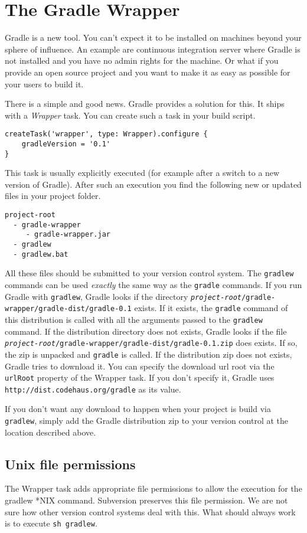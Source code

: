 \chapter{The Gradle Wrapper} %
\label{cha:the_gradle_wrapper}
Gradle is a new tool. You can't expect it to be installed on machines beyond your sphere of influence. An example are continuous integration server where Gradle is not installed and you have no admin rights for the machine. Or what if you provide an open source project and you want to make it as easy as possible for your users to build it.

There is a simple and good news. Gradle provides a solution for this. It ships with a \emph{Wrapper} task. You can create such a task in your build script.
\begin{Verbatim}
createTask('wrapper', type: Wrapper).configure {
    gradleVersion = '0.1'
}	
\end{Verbatim}
This task is usually explicitly executed (for example after a switch to a new version of Gradle). After such an execution you find the following new or updated files in your project folder.
\begin{Verbatim}
project-root
  - gradle-wrapper
     - gradle-wrapper.jar
  - gradlew
  - gradlew.bat
\end{Verbatim}
\noindent
All these files should be submitted to your version control system. The \texttt{gradlew} commands can be used \emph{exactly} the same way as the \texttt{gradle} commands. If you run Gradle with \texttt{gradlew}, Gradle looks if the directory \texttt{\emph{project-root}/gradle-wrapper/gradle-dist/gradle-0.1} exists. If it exists, the \texttt{gradle} command of this distribution is called with all the arguments passed to the \texttt{gradlew} command.
If the distribution directory does not exists, Gradle looks if the file \texttt{\emph{project-root}/gradle-wrapper/gradle-dist/gradle-0.1.zip} does exists. If so, the zip is unpacked and \texttt{gradle} is called. If the distribution zip does not exists, Gradle tries to download it. You can specify the download url root via the \texttt{urlRoot} property of the Wrapper task. If you don't specify it, Gradle uses \texttt{http://dist.codehaus.org/gradle} as its value. 

If you don't want any download to happen when your project is build via \texttt{gradlew}, simply add the Gradle distribution zip to your version control at the location described above. 

\section{Unix file permissions} %
\label{sec:unix_file_permissions}
The Wrapper task adds appropriate file permissions to allow the execution for the gradlew *NIX command. Subversion preserves this file permission. We are not sure how other version control systems deal with this. What should always work is to execute \texttt{sh gradlew}. 

